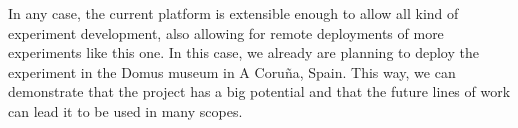 In any case, the current platform is extensible enough to allow all kind of experiment development,
also allowing for remote deployments of more experiments like this one. In this case, we already
are planning to deploy the experiment in the Domus museum in A Coruña, Spain. This way, we can
demonstrate that the project has a big potential and that the future lines of work can lead it to
be used in many scopes.
